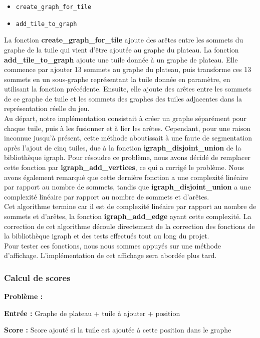 \documentclass[10pt]{article}
\begin{document}
\begin{itemize}
    \item \texttt{create\_graph\_for\_tile}
        \item \texttt{add\_tile\_to\_graph}
\end{itemize}
La fonction \textbf{create\_graph\_for\_tile} ajoute des arêtes entre les sommets du graphe de la tuile qui vient d'être ajoutée au graphe du plateau. La fonction \textbf{add\_tile\_to\_graph} ajoute une tuile donnée à un graphe de plateau. Elle commence par ajouter 13 sommets au graphe du plateau, puis transforme ces 13 sommets en un sous-graphe représentant la tuile donnée en paramètre, en utilisant la fonction précédente. Ensuite, elle ajoute des arêtes entre les sommets de ce graphe de tuile et les sommets des graphes des tuiles adjacentes dans la représentation réelle du jeu.\\
Au départ, notre implémentation consistait à créer un graphe séparément pour chaque tuile, puis à les fusionner et à lier les arêtes. Cependant, pour une raison inconnue jusqu'à présent, cette méthode aboutissait à une faute de segmentation après l'ajout de cinq tuiles, due à la fonction \textbf{igraph\_disjoint\_union} de la bibliothèque igraph. Pour résoudre ce problème, nous avons décidé de remplacer cette fonction par \textbf{igraph\_add\_vertices}, ce qui a corrigé le problème. Nous avons également remarqué que cette dernière fonction a une complexité linéaire par rapport au nombre de sommets, tandis que \textbf{igraph\_disjoint\_union} a une complexité linéaire par rapport au nombre de sommets et d'arêtes.\\
Cet algorithme termine car il est de complexité linéaire par rapport au nombre de sommets et d'arêtes, la fonction \textbf{igraph\_add\_edge} ayant cette complexité. La correction de cet algorithme découle directement de la correction des fonctions de la bibliothèque igraph et des tests effectués tout au long du projet.\\
Pour tester ces fonctions, nous nous sommes appuyés sur une méthode d'affichage. L'implémentation de cet affichage sera abordée plus tard.\\
\subsubsection{Calcul de scores}
\textbf{Problème :}

\textbf{Entrée :} Graphe de plateau + tuile à ajouter + position

\textbf{Score :} Score ajouté si la tuile est ajoutée à cette position dans le graphe\\
\end{document}

